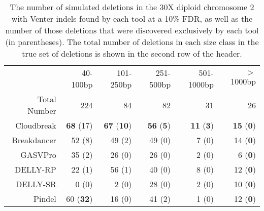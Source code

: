\documentclass[11pt]{article}
\begin{document}
\begin{table}[h]
\begin{center}
\begin{tabular}{rrrrrr}
  \hline
 & 40-100bp  & 101-250bp  & 251-500bp & 501-1000bp & $>$ 1000bp \\ 
 Total Number & 224 &  84 & 82 &  31 & 26\\ 
  \hline
  Cloudbreak  & \textbf{68} (17)  & \textbf{67} (\textbf{10}) &  \textbf{56} (\textbf{5}) & \textbf{11} (\textbf{3}) & \textbf{15} (\textbf{0}) \\ 
  Breakdancer & 52 (8)  & 49 (2) &  49 (0) & 7 (0) & 14 (\textbf{0}) \\ 
  GASVPro     & 35 (2)  & 26 (0) &  26 (0) & 2 (0) & 6 (\textbf{0}) \\ 
  DELLY-RP       & 22 (1)  & 56 (1) &  40 (0) & 8 (0) & 12 (\textbf{0}) \\ 
  DELLY-SR       & 0 (0)  & 2 (0) &  28 (0) & 2 (0) & 10 (\textbf{0}) \\ 
  Pindel      & 60 (\textbf{32})  & 16 (0) &  41 (2) & 1 (0) & 12 (\textbf{0})\\ 
   \hline
\end{tabular}
\end{center}
\caption{The number of simulated deletions in the 30X diploid chromosome 2 with Venter indels found by each tool at a 10\% FDR, as well as the number of those deletions that were discovered exclusively by each tool (in parentheses). The total number of deletions in each size class in the true set of deletions is shown in the second row of the header.}
\label{chr2DeletionPredsFDR10}
\end{table}

\clearpage
\end{document}
